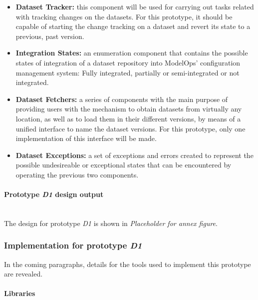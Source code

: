 \begin{itemize}
    \item \textbf{Dataset Tracker: }this component will be used for carrying out tasks related with tracking changes on the datasets. For this prototype, it should be 
    capable of starting the change tracking on a dataset and revert its state to a previous, past version.
    
    \item \textbf{Integration States: }an enumeration component that contains the possible states of integration of a dataset repository into ModelOps' configuration management 
    system: Fully integrated, partially or semi-integrated or not integrated.
    
    \item \textbf{Dataset Fetchers: }a series of components with the main purpose of providing users with the mechanism to obtain datasets from virtually any location, as well as to 
    load them in their different versions, by means of a unified interface to name the dataset versions. For this prototype, only one implementation of this interface will be made.
    
    \item \textbf{Dataset Exceptions: }a set of exceptions and errors created to represent the possible undesireable or exceptional states that can be encountered by operating 
    the previous two components.

\end{itemize}



\paragraph{Prototype \emph{D1} design output}\mbox{}\\

The design for prototype \emph{D1} is shown in \emph{Placeholder for annex figure}.

\subsubsection{Implementation for prototype \emph{D1}}

In the coming paragraphs, details for the tools used to implement this prototype are revealed.

\paragraph{Libraries} \mbox{}\\

